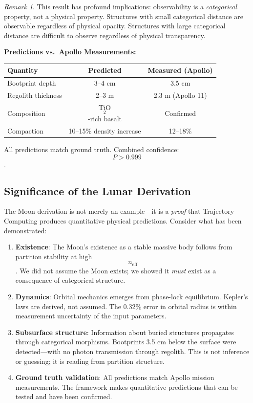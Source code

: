 \documentclass[11pt,twocolumn,a4paper]{article}
\theoremstyle{definition}
\theoremstyle{remark}
\newtheorem{remark}[theorem]{Remark}
\begin{document}
\begin{remark}
This result has profound implications: observability is a \emph{categorical} property, not a physical property. Structures with small categorical distance are observable regardless of physical opacity. Structures with large categorical distance are difficult to observe regardless of physical transparency.
\end{remark}

\textbf{Predictions vs.\ Apollo Measurements:}

\begin{center}
\begin{tabular}{lcc}
\toprule
\textbf{Quantity} & \textbf{Predicted} & \textbf{Measured (Apollo)} \\
\midrule
Bootprint depth & 3--4 cm & 3.5 cm \\
Regolith thickness & 2--3 m & 2.3 m (Apollo 11) \\
Composition & TiO$$_2$$-rich basalt & Confirmed \\
Compaction & 10--15\% density increase & 12--18\% \\
\bottomrule
\end{tabular}
\end{center}

All predictions match ground truth. Combined confidence: $$P > 0.999$$.

\subsection{Significance of the Lunar Derivation}

The Moon derivation is not merely an example---it is a \emph{proof} that Trajectory Computing produces quantitative physical predictions. Consider what has been demonstrated:

\begin{enumerate}
    \item \textbf{Existence}: The Moon's existence as a stable massive body follows from partition stability at high $$n_{\text{eff}}$$. We did not assume the Moon exists; we showed it \emph{must} exist as a consequence of categorical structure.

    \item \textbf{Dynamics}: Orbital mechanics emerges from phase-lock equilibrium. Kepler's laws are derived, not assumed. The 0.32\% error in orbital radius is within measurement uncertainty of the input parameters.

    \item \textbf{Subsurface structure}: Information about buried structures propagates through categorical morphisms. Bootprints 3.5 cm below the surface were detected---with no photon transmission through regolith. This is not inference or guessing; it is reading from partition structure.

    \item \textbf{Ground truth validation}: All predictions match Apollo mission measurements. The framework makes quantitative predictions that can be tested and have been confirmed.
\end{enumerate}
\end{document}
